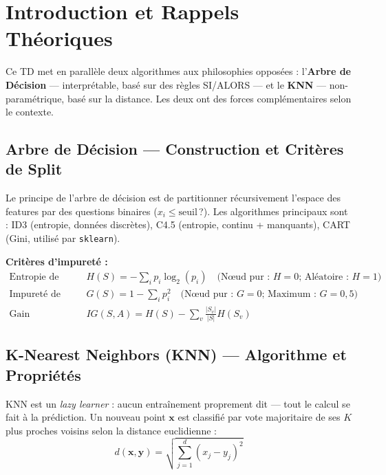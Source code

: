\documentclass[12pt,a4paper]{article}
\begin{document}
\newpage
\tableofcontents
\newpage

\section{Introduction et Rappels Théoriques}

Ce TD met en parallèle deux algorithmes aux philosophies opposées : l'\textbf{Arbre de Décision}
— interprétable, basé sur des règles SI/ALORS — et le \textbf{KNN} — non-paramétrique,
basé sur la distance. Les deux ont des forces complémentaires selon le contexte.

\subsection{Arbre de Décision — Construction et Critères de Split}

Le principe de l'arbre de décision est de partitionner récursivement l'espace des features
par des questions binaires ($x_i \leq \text{seuil}$\,?). Les algorithmes principaux sont :
ID3 (entropie, données discrètes), C4.5 (entropie, continu + manquants), CART (Gini, utilisé
par \texttt{sklearn}).

\textbf{Critères d'impureté :}
\begin{align}
  \text{Entropie de Shannon :} &\quad H(S) = -\sum_{i} p_i \log_2(p_i)
    \quad \text{(Nœud pur : }H=0\text{; Aléatoire : }H=1\text{)}\\[4pt]
  \text{Impureté de Gini :} &\quad G(S) = 1 - \sum_{i} p_i^2
    \quad \text{(Nœud pur : }G=0\text{; Maximum : }G=0{,}5\text{)}\\[4pt]
  \text{Gain d'information :} &\quad IG(S,A) = H(S) - \sum_{v}
    \frac{|S_v|}{|S|} H(S_v)
\end{align}

\subsection{K-Nearest Neighbors (KNN) — Algorithme et Propriétés}

KNN est un \emph{lazy learner} : aucun entraînement proprement dit — tout le calcul se fait à la prédiction.
Un nouveau point $\mathbf{x}$ est classifié par vote majoritaire de ses $K$ plus proches voisins selon la
distance euclidienne :
\begin{equation}
  d(\mathbf{x},\mathbf{y}) = \sqrt{\sum_{j=1}^{d}(x_j - y_j)^2}
\end{equation}
\end{document}
